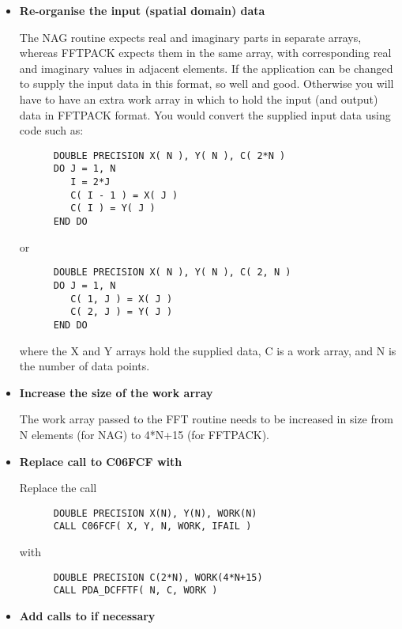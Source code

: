 \begin{itemize}

\item{\bf Re-organise the input (spatial domain) data}

   The NAG routine expects real and imaginary parts in separate arrays,
   whereas FFTPACK expects them in the same array, with corresponding
   real and imaginary values in adjacent elements. If the application
   can be changed to supply the input data in this format, so well and
   good. Otherwise you will have to have an extra work array in which to
   hold the input (and output) data in FFTPACK format. You would convert
   the supplied input data using code such as:

\begin{verbatim}
      DOUBLE PRECISION X( N ), Y( N ), C( 2*N )
      DO J = 1, N
         I = 2*J
         C( I - 1 ) = X( J )
         C( I ) = Y( J )
      END DO
\end{verbatim}

   or

\begin{verbatim}
      DOUBLE PRECISION X( N ), Y( N ), C( 2, N )
      DO J = 1, N
         C( 1, J ) = X( J )
         C( 2, J ) = Y( J )
      END DO
\end{verbatim}

   where the X and Y arrays hold the supplied data, C is a work array,
   and N is the number of data points.

\item{\bf Increase the size of the work array}

   The work array passed to the FFT routine needs to be increased in
   size from N elements (for NAG) to 4*N+15 (for FFTPACK).

\item{\bf Replace call to C06FCF with
}

   Replace the call

\begin{verbatim}
      DOUBLE PRECISION X(N), Y(N), WORK(N)
      CALL C06FCF( X, Y, N, WORK, IFAIL )
\end{verbatim}

   with

\begin{verbatim}
      DOUBLE PRECISION C(2*N), WORK(4*N+15)
      CALL PDA_DCFFTF( N, C, WORK )
\end{verbatim}

\item{\bf Add calls to
   if necessary}


\end{itemize}
